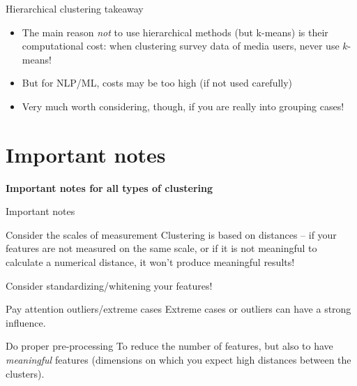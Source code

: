 \documentclass[compress]{beamer}
\begin{document}
\begin{frame}{Hierarchical clustering takeaway}
\begin{itemize}
\item The main reason \emph{not} to use hierarchical methods (but k-means) is their computational cost: when clustering survey data of media users, never use $k$-means!
\item But for NLP/ML, costs may be too high (if not used carefully)
\item Very much worth considering, though, if you are really into grouping cases!
\end{itemize}
\end{frame}


\section{Important notes}
\begin{frame}[plain]
\textbf{Important notes for all types of clustering}
\end{frame}


\begin{frame}{Important notes}
\begin{block}{Consider the scales of measurement}
Clustering is based on distances -- if your features are not measured on the same scale, or if it is not meaningful to calculate a numerical distance, it won't produce meaningful results!

Consider standardizing/whitening your features!
\end{block}

\pause

\begin{block}{Pay attention outliers/extreme cases}
Extreme cases or outliers can have a strong influence.
\end{block}

\pause 
\begin{block}{Do proper pre-processing}
To reduce the number of features, but also to have \emph{meaningful} features (dimensions on which you expect high distances between the clusters).
\end{block}


\end{frame}
\end{document}
